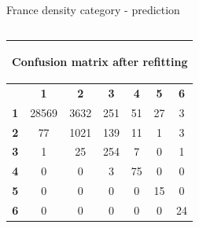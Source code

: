 \documentclass[c]{beamer}
\begin{document}
\begin{frame}
\begin{columns}
\begin{column}{0.5\textwidth}
\begin{overlayarea}{\linewidth}{4cm}
  \end{overlayarea}
  \begin{overlayarea}{\linewidth}{0.5cm}
    \centering
    \tiny France density category - prediction\par
  \end{overlayarea}
 \end{column}
\end{columns}

\begin{columns}
\begin{column}{0.6\textwidth}
  \begin{table}
  \begin{center}
  \begin{adjustbox}{max width=0.6\textwidth}
  {\tiny
  \begin{tabular}{|c|c|c|c|c|c|c|}
    \hline
    \multicolumn{7}{|c|}{{\tiny \begin{bf}Confusion matrix after refitting\end{bf}}} \\
    \hline
     & \textbf{1} & \textbf{2} & \textbf{3} & \textbf{4} & \textbf{5} & \textbf{6}\\
    \hline
    \textbf{1} & 28569 & 3632 & 251 & 51 & 27 & 3\\
    \hline
    \textbf{2} & 77 & 1021 & 139 & 11 & 1 & 3\\
    \hline
    \textbf{3} & 1 & 25 & 254 & 7 & 0 & 1\\
    \hline
    \textbf{4} & 0 & 0 & 3 & 75 & 0 & 0\\
    \hline
    \textbf{5} & 0 & 0 & 0 & 0 & 15 & 0\\
    \hline
    \textbf{6} & 0 & 0 & 0 & 0 & 0 & 24\\
    \hline
  \end{tabular}
  }
  \end{adjustbox}
  \end{center}
  \end{table}
\end{column}
\begin{column}{0.6\textwidth}

\end{column}
\end{columns}
\end{frame}
\end{document}
